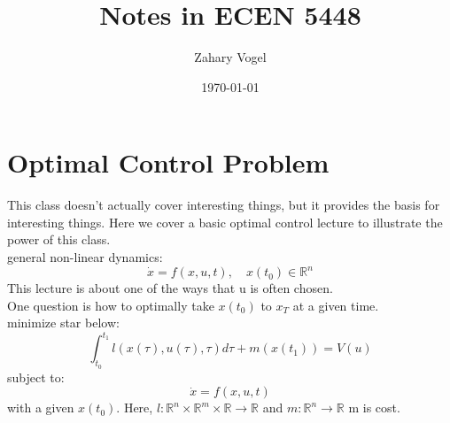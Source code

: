\documentclass{article}
\author{Zahary Vogel}
\date{\today}
\title{Notes in ECEN 5448}
\begin{document}
\maketitle


\section{Optimal Control Problem}
This class doesn't actually cover interesting things, but it provides the basis for interesting things. Here we cover a basic optimal control lecture to illustrate the power of this class.\\
general non-linear dynamics:
\[\dot{x}=f(x,u,t),\quad x(t_0)\in\mathbb{R}^n\]
This lecture is about one of the ways that u is often chosen.\\
One question is how to optimally take $x(t_0)$ to $x_T$ at a given time.\\
minimize star below:
\[\int_{t_0}^{t_1}l(x(\tau),u(\tau),\tau)d\tau+m(x(t_1))=V(u)\]
subject to:
\[\dot{x}=f(x,u,t)\]
with a given $x(t_0)$. Here, $l:\mathbb{R}^n\times \mathbb{R}^m\times \mathbb{R}\to\mathbb{R}$ and $m:\mathbb{R}^n\to\mathbb{R}$ m is cost.\\
\end{document}
